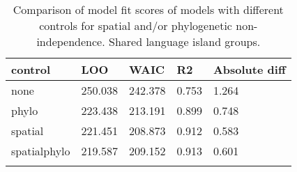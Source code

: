 \begin{longtable}{p{2cm}p{2cm}p{2cm}p{2cm}p{2cm}}
  \toprule
control & LOO & WAIC & R2 & Absolute diff \\ 
  \midrule
none & 250.038 & 242.378 & 0.753 & 1.264 \\ 
  phylo & 223.438 & 213.191 & 0.899 & 0.748 \\ 
  spatial & 221.451 & 208.873 & 0.912 & 0.583 \\ 
  spatialphylo & 219.587 & 209.152 & 0.913 & 0.601 \\ 
   \bottomrule
\caption{Comparison of model fit scores of models with different controls for spatial and/or phylogenetic non-independence. Shared language island groups.} 
\label{model_fit_score_table_medium}
\end{longtable}

